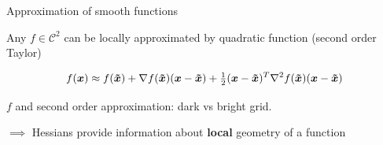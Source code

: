 \documentclass[11pt,compress,t,notes=noshow, xcolor=table]{beamer}
\begin{document}
\begin{framei}{Approximation of smooth functions}
\item Any $f \in \mathcal{C}^2$ can be locally approximated by quadratic function (second order Taylor)
\item[] \begin{equation*}
f(\bm{x}) \approx f(\bm{\tilde{x}}) + \nabla f(\bm{\tilde{x}})(\bm{x}-\bm{\tilde{x}}) + \tfrac 12(\bm{x}-\bm{\tilde{x}})^T\nabla^2 f(\bm{\tilde{x}})(\bm{x}-\bm{\tilde{x}})
\end{equation*}
\begin{center}\begin{footnotesize} $f$ and second order approximation: dark vs bright grid.\end{footnotesize}\end{center}
\item $\implies$ Hessians provide information about \textbf{local} geometry of a function
\end{framei}
  
\endlecture
\end{document}
